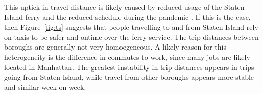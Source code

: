 \documentclass[11pt]{article}
\begin{document}

\begin{multicols}{2}
    This uptick in travel distance is likely caused by reduced usage of the Staten Island ferry and the reduced schedule during the pandemic \cite{dot2020}.
    If this is the case, then Figure~\ref{fig:ts} suggests that people travelling to and from Staten Island rely on taxis to be safer and ontime over the ferry service.
    The trip distances between boroughs are generally not very homoegeneous. 
    A likely reason for this heterogeneity is the difference in commutes to work, since
    many jobs are likely located in Manhattan.
    The greatest instability in trip distances appears in trips going from Staten Island,
    while travel from other boroughs appears more stable and similar week-on-week. 

    
    



\end{multicols}
\end{document}
